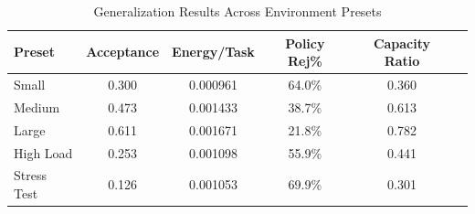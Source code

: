 \begin{table}[h]
\centering
\caption{Generalization Results Across Environment Presets}
\label{tab:generalization}
\begin{tabular}{lccccc}
\toprule
Preset & Acceptance & Energy/Task & Policy Rej\% & Capacity Ratio \\
\midrule
Small & 0.300 & 0.000961 & 64.0\% & 0.360 \\
Medium & 0.473 & 0.001433 & 38.7\% & 0.613 \\
Large & 0.611 & 0.001671 & 21.8\% & 0.782 \\
High Load & 0.253 & 0.001098 & 55.9\% & 0.441 \\
Stress Test & 0.126 & 0.001053 & 69.9\% & 0.301 \\
\bottomrule
\end{tabular}
\end{table}
